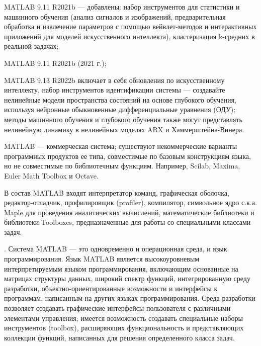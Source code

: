 \begin{textitemize}
	\item MATLAB 9.11 R2021b --- добавлены: набор инструментов для статистики и машинного обучения (анализ сигналов и изображений, предварительная обработка и извлечение параметров с помощью вейвлет-методов и интерактивных приложений для моделей искусственного интеллекта), кластеризация k-средних в реальной задачах; 
	\item MATLAB 9.11 R2021b (2021 г.);
	\item MATLAB 9.13 R2022b включает в себя обновления по искусственному интеллекту, набор инструментов идентификации системы --- создавайте нелинейные модели пространства состояний на основе глубокого обучения, используя нейронные обыкновенные дифференциальные уравнения (ОДУ); методы машинного обучения и глубокого обучения также могут представлять нелинейную динамику в нелинейных моделях ARX и Хаммерштейна-Винера.
\end{textitemize}

MATLAB --- коммерческая система; существуют некоммерческие варианты программных продуктов ее типа, совместимые по базовым конструкциям языка, но не совместимые по библиотечным функциям. Например, Scilab, Maxima, Euler Math Toolbox и Octave.

В состав MATLAB входят интерпретатор команд, графическая оболочка, редактор-отладчик, профилировщик (profiler), компилятор, символьное ядро с.к.а. Maple для проведения аналитических вычислений, математические библиотеки и библиотеки Toolboxes, предназначенные для работы со специальными классами задач.

.
Система MATLAB --- это одновременно и операционная среда, и язык программирования. Язык MATLAB является высокоуровневым интерпретируемым языком программирования, включающим основанные на матрицах структуры данных, широкий спектр функций, интегрированную среду разработки, объектно-ориентированные возможности и интерфейсы к программам, написанным на других языках программирования. Среда разработки позволяет создавать графические интерфейсы пользователя с различными элементами управления; имеется возможность создавать специальные наборы инструментов (toolbox), расширяющих функциональность и представляющих коллекции функций, написанных для решения определенного класса задач.

